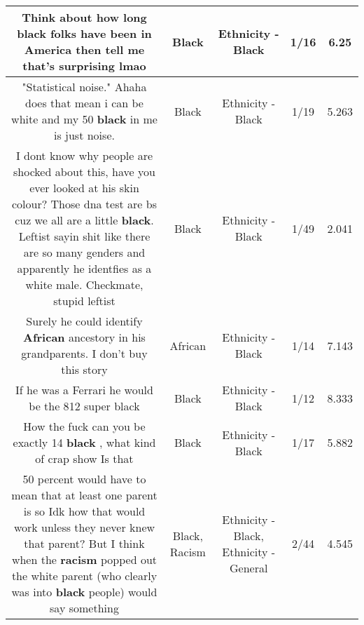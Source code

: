 \documentclass[11pt]{article}
\newlength\mylength
\begin{document}
\begin{center}
\begin{longtable}{|C{.65\mylength}|C{.30\mylength}|C{.12\mylength}|C{.12\mylength}|C{.12\mylength}|}
  \small Think about how long \textbf{black} folks have been in America then tell me that's surprising lmao\normalsize   & Black & Ethnicity - Black & 1/16 & 6.25 \\  \hline
  \small "Statistical noise." Ahaha does that mean i can be white and my 50 \textbf{black} in me is just noise.\normalsize   & Black & Ethnicity - Black & 1/19 & 5.263 \\  \hline
  \small I dont know why people are shocked about this, have you ever looked at his skin colour? Those dna test are bs cuz we all are a little \textbf{black}. Leftist sayin shit like there are so many genders and apparently he identfies as a white male. Checkmate, stupid leftist\normalsize   & Black & Ethnicity - Black & 1/49 & 2.041 \\  \hline
  \small Surely he could identify \textbf{African} ancestory in his grandparents. I don't buy this story\normalsize   & African & Ethnicity - Black & 1/14 & 7.143 \\  \hline
  \small If he was a Ferrari he would be the 812 super black\normalsize   & Black & Ethnicity - Black & 1/12 & 8.333 \\  \hline
  \small How the fuck can you be exactly 14 \textbf{black} , what kind of crap show Is that\normalsize   & Black & Ethnicity - Black & 1/17 & 5.882 \\  \hline
  \small 50 percent would have to mean that at least one parent is so Idk how that would work unless they never knew that parent? But I think when the \textbf{racism} popped out the white parent (who clearly was into \textbf{black} people) would say something\normalsize   & Black, Racism & Ethnicity - Black, Ethnicity - General & 2/44 & 4.545 \\  \hline

\end{longtable}
\end{center}
\end{document}
